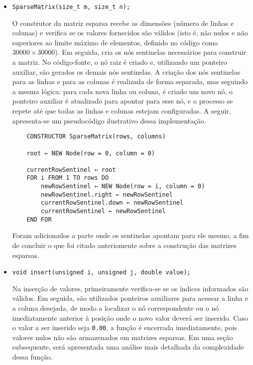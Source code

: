 \documentclass[12pt]{article}
\begin{document}
\begin{itemize}
    \item \verb|SparseMatrix(size_t m, size_t n);|
    
    \newline O construtor da matriz esparsa recebe as dimensões (número de linhas e colunas) e verifica se os valores fornecidos são válidos (isto é, não nulos e não superiores ao limite máximo de elementos, definido no código como \(30000 \times 30000\)). Em seguida, cria os nós sentinelas necessários para construir a matriz. No código-fonte, o nó raiz é criado e, utilizando um ponteiro auxiliar, são gerados os demais nós sentinelas. A criação dos nós sentinelas para as linhas e para as colunas é realizada de forma separada, mas seguindo a mesma lógica: para cada nova linha ou coluna, é criado um novo nó, o ponteiro auxiliar é atualizado para apontar para esse nó, e o processo se repete até que todas as linhas e colunas estejam configuradas. A seguir, apresenta-se um pseudocódigo ilustrativo dessa implementação.

    \begin{Verbatim}
    CONSTRUCTOR SparseMatrix(rows, columns)
    
    root ← NEW Node(row = 0, column = 0)

    currentRowSentinel ← root
    FOR i FROM 1 TO rows DO
        newRowSentinel ← NEW Node(row = i, column = 0)
        newRowSentinel.right ← newRowSentinel
        currentRowSentinel.down ← newRowSentinel
        currentRowSentinel ← newRowSentinel
    END FOR

    \end{Verbatim}
    Foram adicionados a parte onde os sentinelas apontam para ele mesmo, a fim de concluir o que foi citado anteriomente sobre a construção das matrizes esparsas. 
    
    \item \verb|void insert(unsigned i, unsigned j, double value);|
    
    \newline Na inserção de valores, primeiramente verifica-se se os índices informados são válidos. Em seguida, são utilizados ponteiros auxiliares para acessar a linha e a coluna desejada, de modo a localizar o nó correspondente ou o nó imediatamente anterior à posição onde o novo valor deverá ser inserido. Caso o valor a ser inserido seja \verb|0.00|, a função é encerrada imediatamente, pois valores nulos não são armazenados em matrizes esparsas. Em uma seção subsequente, será apresentada uma análise mais detalhada da complexidade dessa função.
    

\end{itemize}
\end{document}
